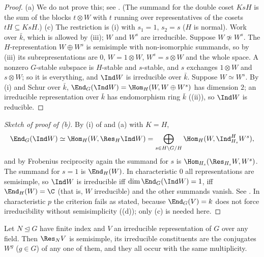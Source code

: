 \begin{proof}
(a) We do not prove this; see \cite[Section 7.3]{SerreLinearReps}. (The summand for the double coset $KsH$ is the sum of the blocks
$t\otimes W$ with $t$ running over representatives of the cosets $tH\subseteq KsH$.)
(c) The restriction is (i) with $s_1=1$, $s_2=s$ ($H$ is normal). Work over $\bar k$, which is allowed by
(iii); $W$ and $W^s$ are irreducible. Suppose $W\not\simeq W^s$. The $H$-representation $W\oplus W^s$ is semisimple
with non-isomorphic summands, so by (iii) its subrepresentations are $0$, $W=1\otimes W$, $W^s=s\otimes W$ and the whole
space. A nonzero $G$-stable subspace is $H$-stable and $s$-stable, and $s$ exchanges $1\otimes W$ and $s\otimes W$; so it is everything, and $\Ind W$
is irreducible over $\bar k$. Suppose $W\simeq W^s$. By (i) and Schur over $\bar k$,
$\End_G(\Ind W)=\Hom_H(W,W\oplus W^s)$ has dimension $2$; an irreducible representation over $\bar k$ has endomorphism ring $\bar k$
((ii)), so $\Ind W$ is reducible.
\end{proof}

\begin{proof}[Sketch of proof of (b)]
By (i) of  and (a) with $K=H$,
\[
\End_G(\Ind W)\simeq\Hom_H(W,\Res_H\Ind W)=\bigoplus_{s\in H\backslash G/H}\Hom_H(W,\Ind^H_{H_s}W^s),
\]
and by Frobenius reciprocity again the summand for $s$ is $\Hom_{H_s}(\Res_{H_s}W,W^s)$. The summand for $s=1$ is $\End_H(W)$. In characteristic $0$ all
representations are semisimple, so $\Ind W$ is irreducible iff $\dim\End_G(\Ind W)=1$, iff $\End_H(W)=\C$ (that is, $W$ irreducible) and the
other summands vanish. See \cite[Section 7.4]{SerreLinearReps}. In characteristic $p$ the criterion fails as stated, because
$\End_G(V)=k$ does not force irreducibility without semisimplicity ((d)); only (c) is needed here.
\end{proof}

\begin{theorem}[Clifford]\label{thm:reps:clifford}
Let $N\trianglelefteq G$ have finite index and $V$ an irreducible representation of $G$ over any field. Then $\Res_NV$ is semisimple, its
irreducible constituents are the conjugates $W^g$ ($g\in G$) of any one of them, and they all occur with the same multiplicity.
\end{theorem}

